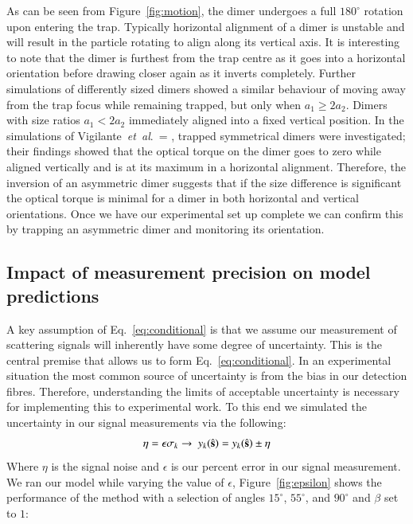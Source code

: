 \documentclass[final,  3p]{elsarticle}
\begin{document}
As can be seen from Figure~\ref{fig:motion}, the dimer undergoes a full $180^{\circ}$ rotation upon entering the trap.  Typically horizontal alignment of a dimer is unstable and will result in the particle rotating to align along its vertical axis.  It is interesting to note that the dimer is furthest from the trap centre as it goes into a horizontal orientation before drawing closer again as it inverts completely. Further simulations of differently sized dimers showed a similar behaviour of moving away from the trap focus while remaining trapped, but only when $a_1 \geq 2a_2$.  Dimers with size ratios $a_1 < 2a_2$ immediately aligned into a fixed vertical position.
%
In the simulations of Vigilante~\emph{et~al}.\ = \cite{Vigilante2020Brownian_OT}, trapped symmetrical dimers were investigated; their findings showed that the optical torque on the dimer goes to zero while aligned vertically and is at its maximum in a horizontal alignment. Therefore, the inversion of an asymmetric dimer suggests that if the size difference is significant the optical torque is minimal for a dimer in both horizontal and vertical orientations. Once we have our experimental set up complete we can confirm this by trapping an asymmetric dimer and monitoring its orientation. 
\subsection{Impact of measurement precision on model predictions}
\label{sec:epsilon}

A key assumption of Eq.~\eqref{eq:conditional} is that we assume our measurement of scattering signals will inherently have some degree of uncertainty. This is the central premise that allows us to form Eq.~\eqref{eq:conditional}. In an experimental situation the most common source of uncertainty is from the bias in our detection fibres. Therefore, understanding the limits of acceptable uncertainty is necessary for implementing this to experimental work. To this end we simulated the uncertainty in our signal measurements via the following:
\begin{align}
	\eta = \epsilon \sigma_k
	\rightarrow \ y_k(\hat{\bf{s}}) = y_k(\hat{\bf{s}}) \pm \eta
\end{align}
Where $\eta$ is the signal noise and $\epsilon$ is our percent error in our signal measurement. We ran our model while varying the value of $\epsilon$, Figure~\ref{fig:epsilon} shows the performance of the method with a selection of angles $15^{\circ}$, $55^{\circ}$, and $90^{\circ}$ and $\beta$ set to $1$:
\end{document}
